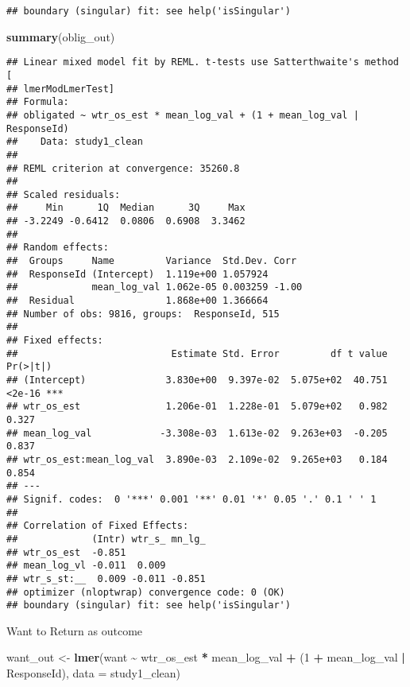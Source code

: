 \documentclass[
]{article}
\newenvironment{Shaded}{\begin{snugshade}}{\end{snugshade}}
\newcommand{\AttributeTok}[1]{\textcolor[rgb]{0.13,0.29,0.53}{#1}}
\newcommand{\DecValTok}[1]{\textcolor[rgb]{0.00,0.00,0.81}{#1}}
\newcommand{\FunctionTok}[1]{\textcolor[rgb]{0.13,0.29,0.53}{\textbf{#1}}}
\newcommand{\NormalTok}[1]{#1}
\newcommand{\OtherTok}[1]{\textcolor[rgb]{0.56,0.35,0.01}{#1}}
\newcommand{\SpecialCharTok}[1]{\textcolor[rgb]{0.81,0.36,0.00}{\textbf{#1}}}
\begin{document}
\begin{verbatim}
## boundary (singular) fit: see help('isSingular')
\end{verbatim}

\begin{Shaded}
\begin{Highlighting}[]
\FunctionTok{summary}\NormalTok{(oblig\_out)}
\end{Highlighting}
\end{Shaded}

\begin{verbatim}
## Linear mixed model fit by REML. t-tests use Satterthwaite's method [
## lmerModLmerTest]
## Formula: 
## obligated ~ wtr_os_est * mean_log_val + (1 + mean_log_val | ResponseId)
##    Data: study1_clean
## 
## REML criterion at convergence: 35260.8
## 
## Scaled residuals: 
##     Min      1Q  Median      3Q     Max 
## -3.2249 -0.6412  0.0806  0.6908  3.3462 
## 
## Random effects:
##  Groups     Name         Variance  Std.Dev. Corr 
##  ResponseId (Intercept)  1.119e+00 1.057924      
##             mean_log_val 1.062e-05 0.003259 -1.00
##  Residual                1.868e+00 1.366664      
## Number of obs: 9816, groups:  ResponseId, 515
## 
## Fixed effects:
##                           Estimate Std. Error         df t value Pr(>|t|)    
## (Intercept)              3.830e+00  9.397e-02  5.075e+02  40.751   <2e-16 ***
## wtr_os_est               1.206e-01  1.228e-01  5.079e+02   0.982    0.327    
## mean_log_val            -3.308e-03  1.613e-02  9.263e+03  -0.205    0.837    
## wtr_os_est:mean_log_val  3.890e-03  2.109e-02  9.265e+03   0.184    0.854    
## ---
## Signif. codes:  0 '***' 0.001 '**' 0.01 '*' 0.05 '.' 0.1 ' ' 1
## 
## Correlation of Fixed Effects:
##             (Intr) wtr_s_ mn_lg_
## wtr_os_est  -0.851              
## mean_log_vl -0.011  0.009       
## wtr_s_st:__  0.009 -0.011 -0.851
## optimizer (nloptwrap) convergence code: 0 (OK)
## boundary (singular) fit: see help('isSingular')
\end{verbatim}

Want to Return as outcome

\begin{Shaded}
\begin{Highlighting}[]
\NormalTok{want\_out }\OtherTok{\textless{}{-}} \FunctionTok{lmer}\NormalTok{(want }\SpecialCharTok{\textasciitilde{}}\NormalTok{ wtr\_os\_est }\SpecialCharTok{*}\NormalTok{ mean\_log\_val }\SpecialCharTok{+}\NormalTok{ (}\DecValTok{1} \SpecialCharTok{+}\NormalTok{ mean\_log\_val }\SpecialCharTok{|}\NormalTok{ ResponseId), }\AttributeTok{data =}\NormalTok{ study1\_clean)}
\end{Highlighting}
\end{Shaded}
\end{document}
